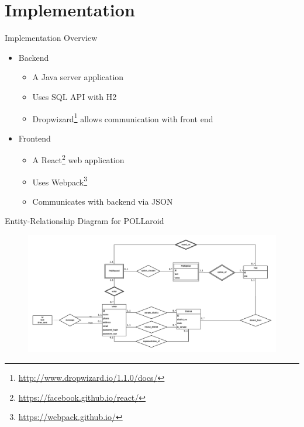 \documentclass[11pt,aps,prb,groupedaddress,nofootinbib,floatfix]{beamer}
\newcommand{\pollaroid}{POLLaroid}
\begin{document}
\section{Implementation}

%
%
\begin{frame}{Implementation Overview}
\begin{itemize}
	\item Backend
	\begin{itemize}
		\item A Java server application
		\item Uses SQL API with H2
		\item Dropwizard\footnote{\url{http://www.dropwizard.io/1.1.0/docs/}} allows communication with front end
	\end{itemize}
	\item Frontend
	\begin{itemize}
		\item A React\footnote{\url{https://facebook.github.io/react/}} web application
		\item Uses Webpack\footnote{\url{https://webpack.github.io/}}
		\item Communicates with backend via JSON
	\end{itemize}
\end{itemize}
\end{frame}


%
%
\begin{frame}{Entity-Relationship Diagram for \pollaroid{}}
\begin{center}
\begin{figure}[t]
\includegraphics[scale=0.13]{er_diag.png}
\end{figure}
\end{center}
\end{frame}
\end{document}
